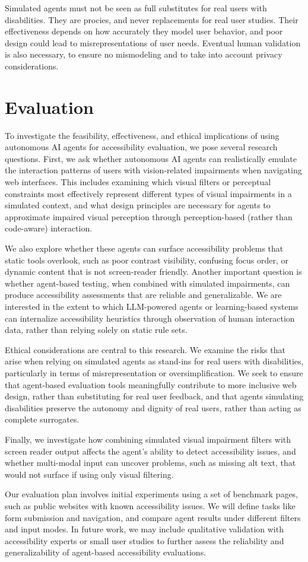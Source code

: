 Simulated agents must not be seen as full substitutes for real users with disabilities. They are procies, and never replacements for real user studies. Their effectiveness depends on how accurately they model user behavior, and poor design could lead to misrepresentations of user needs. Eventual human validation is also necessary, to ensure no mismodeling and to take into account privacy considerations.


\section{Evaluation}

To investigate the feasibility, effectiveness, and ethical implications of using autonomous AI agents for accessibility evaluation, we pose several research questions. First, we ask whether autonomous AI agents can realistically emulate the interaction patterns of users with vision-related impairments when navigating web interfaces. This includes examining which visual filters or perceptual constraints most effectively represent different types of visual impairments in a simulated context, and what design principles are necessary for agents to approximate impaired visual perception through perception-based (rather than code-aware) interaction.

We also explore whether these agents can surface accessibility problems that static tools overlook, such as poor contrast visibility, confusing focus order, or dynamic content that is not screen-reader friendly. Another important question is whether agent-based testing, when combined with simulated impairments, can produce accessibility assessments that are reliable and generalizable. We are interested in the extent to which LLM-powered agents or learning-based systems can internalize accessibility heuristics through observation of human interaction data, rather than relying solely on static rule sets.

Ethical considerations are central to this research. We examine the risks that arise when relying on simulated agents as stand-ins for real users with disabilities, particularly in terms of misrepresentation or oversimplification. We seek to ensure that agent-based evaluation tools meaningfully contribute to more inclusive web design, rather than substituting for real user feedback, and that agents simulating disabilities preserve the autonomy and dignity of real users, rather than acting as complete surrogates.

Finally, we investigate how combining simulated visual impairment filters with screen reader output affects the agent's ability to detect accessibility issues, and whether multi-modal input can uncover problems, such as missing alt text, that would not surface if using only visual filtering.

Our evaluation plan involves initial experiments using a set of benchmark pages, such as public websites with known accessibility issues. We will define tasks like form submission and navigation, and compare agent results under different filters and input modes. In future work, we may include qualitative validation with accessibility experts or small user studies to further assess the reliability and generalizability of agent-based accessibility evaluations.
